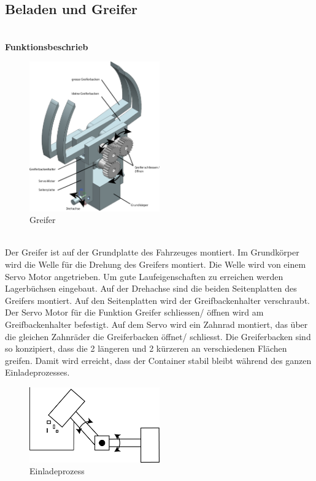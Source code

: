 \subsection{Beladen und Greifer}

\\[0.2cm]
\textbf{Funktionsbeschrieb}\\[0.2cm]
\begin{figure}[H]
\centering
\includegraphics[width=0.5\textwidth]{03_Loesungskonzept/pictures/greifer2.png}
\caption{Greifer}
\end{figure}\\[0.2cm]

Der Greifer ist auf der Grundplatte des Fahrzeuges montiert. Im Grundkörper wird die Welle für die Drehung des Greifers montiert. Die Welle wird von einem Servo Motor angetrieben. Um gute Laufeigenschaften zu erreichen werden Lagerbüchsen eingebaut. Auf der Drehachse sind die beiden Seitenplatten des Greifers montiert. Auf den Seitenplatten wird der Greifbackenhalter verschraubt.  Der Servo Motor für die Funktion Greifer schliessen/ öffnen wird am Greifbackenhalter befestigt. Auf dem Servo wird ein Zahnrad montiert, das über die gleichen Zahnräder die Greiferbacken öffnet/ schliesst. Die Greiferbacken sind so konzipiert, dass die 2 längeren und 2 kürzeren an verschiedenen Flächen greifen. Damit wird erreicht, dass der Container stabil bleibt während des ganzen Einladeprozesses. 

\begin{figure}[H]
\centering
\includegraphics[width=0.5\textwidth]{03_Loesungskonzept/pictures/Beladen_1.png}
\caption{Einladeprozess}
\end{figure}\\[0.2cm]

